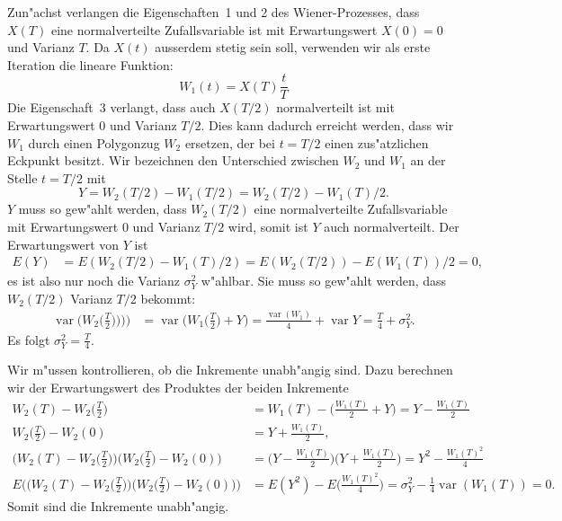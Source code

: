 Zun"achst verlangen die Eigenschaften~1 und 2 des Wiener-Prozesses,
dass $X(T)$ eine normalverteilte Zufallsvariable ist mit Erwartungswert
$X(0)=0$ und Varianz $T$.
Da $X(t)$ ausserdem stetig sein soll, verwenden wir als erste Iteration
die lineare Funktion:
\[
W_1(t) = X(T)\frac{t}{T}
\]
Die Eigenschaft~3 verlangt, dass auch $X(T/2)$ normalverteilt ist mit
Erwartungswert $0$ und Varianz $T/2$.
Dies kann dadurch erreicht werden, dass wir $W_1$ durch einen 
Polygonzug $W_2$ ersetzen, der bei $t=T/2$ einen zus"atzlichen
Eckpunkt besitzt.
Wir bezeichnen den Unterschied zwischen $W_2$ und $W_1$ an der
Stelle $t=T/2$ mit
\[
Y=W_2(T/2)-W_1(T/2)=W_2(T/2) - W_1(T)/2.
\]
$Y$ muss so gew"ahlt werden, dass $W_2(T/2)$ eine normalverteilte
Zufallsvariable mit Erwartungswert $0$ und Varianz $T/2$ wird,
somit ist $Y$ auch normalverteilt.
Der Erwartungswert von $Y$ ist
\begin{align*}
E(Y)&=E(W_2(T/2) - W_1(T)/2)=E(W_2(T/2))-E(W_1(T))/2=0,
\end{align*}
es ist also nur noch die Varianz $\sigma^2_Y$ w"ahlbar.
Sie muss so gew"ahlt werden, dass $W_2(T/2)$ Varianz $T/2$
bekommt:
\begin{align*}
\operatorname{var}\biggl(W_2\biggl(\frac{T}2\biggr))\biggr))
&=
\operatorname{var}\biggl(W_1\biggl(\frac{T}2\biggr) + Y\biggr)
=
\frac{\operatorname{var}(W_1)}4 + \operatorname{var}Y
=
\frac{T}4 +\sigma_Y^2.
\end{align*}
Es folgt $\sigma_Y^2=\frac{T}4$.

Wir m"ussen kontrollieren, ob die Inkremente unabh"angig sind.
Dazu berechnen wir der Erwartungswert des Produktes der
beiden Inkremente
\begin{align*}
W_2(T)-W_2\biggl(\frac{T}2\biggr)
&=
W_1(T)-\biggl(\frac{W_1(T)}2 + Y\biggr)
=
Y-\frac{W_1(T)}2
\\
W_2\biggl(\frac{T}2\biggr)-W_2(0)
&=
Y+
\frac{W_1(T)}2,
\\
\biggl(W_2(T)-W_2\biggl(\frac{T}2\biggr)\biggr)
\biggl(W_2\biggl(\frac{T}2\biggr)-W_2(0)\biggr)
&=
\biggl(Y-\frac{W_1(T)}2\biggr)\biggl(Y+\frac{W_1(T)}2\biggr)
=
Y^2-\frac{W_1(T)^2}4
\\
E\biggl(
\biggl(W_2(T)-W_2\biggl(\frac{T}2\biggr)\biggr)
\biggl(W_2\biggl(\frac{T}2\biggr)-W_2(0)\biggr)
\biggr)
&=
E(Y^2)-E\biggl(\frac{W_1(T)^2}4\biggr)
=
\sigma_Y^2 - \frac14\operatorname{var}(W_1(T))
=
0.
\end{align*}
Somit sind die Inkremente unabh"angig.

